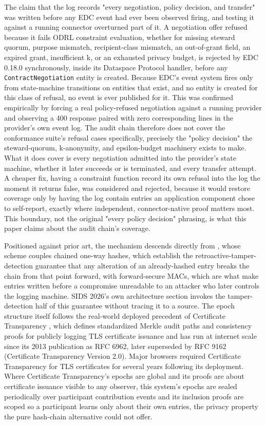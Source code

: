 The claim that the log records "every negotiation, policy decision, and transfer" was written before any EDC event had ever been observed firing, and testing it against a running connector overturned part of it. A negotiation offer refused because it fails ODRL constraint evaluation, whether for missing steward quorum, purpose mismatch, recipient-class mismatch, an out-of-grant field, an expired grant, insufficient k, or an exhausted privacy budget, is rejected by EDC 0.18.0 synchronously, inside its Dataspace Protocol handler, before any \texttt{ContractNegotiation} entity is created. Because EDC's event system fires only from state-machine transitions on entities that exist, and no entity is created for this class of refusal, no event is ever published for it. This was confirmed empirically by forcing a real policy-refused negotiation against a running provider and observing a 400 response paired with zero corresponding lines in the provider's own event log. The audit chain therefore does not cover the conformance suite's refusal cases specifically, precisely the "policy decision" the steward-quorum, k-anonymity, and epsilon-budget machinery exists to make. What it does cover is every negotiation admitted into the provider's state machine, whether it later succeeds or is terminated, and every transfer attempt. A cheaper fix, having a constraint function record its own refusal into the log the moment it returns false, was considered and rejected, because it would restore coverage only by having the log contain entries an application component chose to self-report, exactly where independent, connector-native proof matters most. This boundary, not the original "every policy decision" phrasing, is what this paper claims about the audit chain's coverage.

Positioned against prior art, the mechanism descends directly from \cite{schneier1999}, whose scheme couples chained one-way hashes, which establish the retroactive-tamper-detection guarantee that any alteration of an already-hashed entry breaks the chain from that point forward, with forward-secure MACs, which are what make entries written before a compromise unreadable to an attacker who later controls the logging machine. SIDS 2026's own architecture section invokes the tamper-detection half of this guarantee without tracing it to a source. The epoch structure itself follows the real-world deployed precedent of Certificate Transparency \cite{laurie2013}, which defines standardized Merkle audit paths and consistency proofs for publicly logging TLS certificate issuance and has run at internet scale since its 2013 publication as RFC 6962, later superseded by RFC 9162 (Certificate Transparency Version 2.0). Major browsers required Certificate Transparency for TLS certificates for several years following its deployment. Where Certificate Transparency's epochs are global and its proofs are about certificate issuance visible to any observer, this system's epochs are sealed periodically over participant contribution events and its inclusion proofs are scoped so a participant learns only about their own entries, the privacy property the pure hash-chain alternative could not offer.

